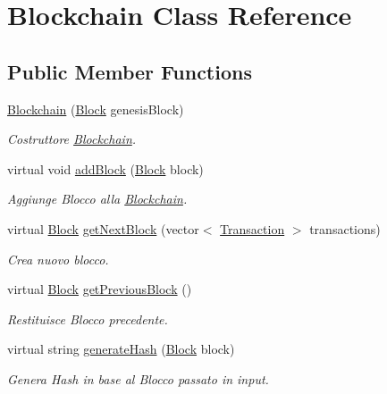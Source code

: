 \hypertarget{class_blockchain}{}\section{Blockchain Class Reference}
\label{class_blockchain}
\subsection*{Public Member Functions}
\begin{DoxyCompactItemize}
\item 
\mbox{\hyperlink{class_blockchain_a5b9d680a89243c663391801caec5d961}{Blockchain}} (\mbox{\hyperlink{class_block}{Block}} genesis\+Block)
\begin{DoxyCompactList}\small\item\em Costruttore \mbox{\hyperlink{class_blockchain}{Blockchain}}. \end{DoxyCompactList}\item 
virtual void \mbox{\hyperlink{class_blockchain_ace37b5ceb8fecfbcca98203a50f7cc7b}{add\+Block}} (\mbox{\hyperlink{class_block}{Block}} block)
\begin{DoxyCompactList}\small\item\em Aggiunge Blocco alla \mbox{\hyperlink{class_blockchain}{Blockchain}}. \end{DoxyCompactList}\item 
virtual \mbox{\hyperlink{class_block}{Block}} \mbox{\hyperlink{class_blockchain_ab354aa0a5e51a564c817255b0ddc3419}{get\+Next\+Block}} (vector$<$ \mbox{\hyperlink{class_transaction}{Transaction}} $>$ transactions)
\begin{DoxyCompactList}\small\item\em Crea nuovo blocco. \end{DoxyCompactList}\item 
virtual \mbox{\hyperlink{class_block}{Block}} \mbox{\hyperlink{class_blockchain_ad283b392e91aee3d33e46199b33aa9a1}{get\+Previous\+Block}} ()
\begin{DoxyCompactList}\small\item\em Restituisce Blocco precedente. \end{DoxyCompactList}\item 
virtual string \mbox{\hyperlink{class_blockchain_ac205005ce824cb95db61f8e51fa4370d}{generate\+Hash}} (\mbox{\hyperlink{class_block}{Block}} block)
\begin{DoxyCompactList}\small\item\em Genera Hash in base al Blocco passato in input. \end{DoxyCompactList}\end{DoxyCompactItemize}


